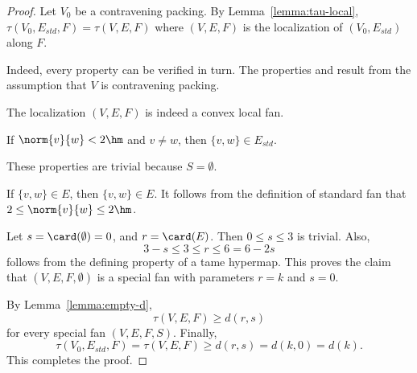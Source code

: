 \begin{proof}
  Let $V_0$ be a contravening packing.  By
  Lemma~\ref{lemma:tau-local}, $\tau(V_0,E_{std},F)=\tau(V,E,F)$ where
  $(V,E,F)$ is the localization of $(V_0,E_{std})$ along $F$.

    Indeed,
  every property can be verified in turn.  The properties
   and  result from the assumption that
  $V$ is contravening packing.

  The localization $(V,E,F)$ is indeed a convex local fan.

 If $\norm{v}{w}<2\hm$ and $v\ne w$, then $\{v,w\}\in
E_{std}$.

  These properties are trivial because
$S=\emptyset$.

 If $\{v,w\}\in E$, then $\{v,w\}\in E$.  It follows from
the definition of standard fan that $2\le \norm{v}{w}\le 2\hm$.

 Let $s=\card(\emptyset) = 0$, and $r=\card(E)$.  Then
$0\le s\le 3$ is trivial. Also,
\[ 3-s \le 3\le r \le 6=6 - 2s\] 
follows from the defining property  of a tame
hypermap.  This proves the claim that $(V,E,F,\emptyset)$ is a special fan with parameters $r=k$ and $s=0$.

By Lemma~\ref{lemma:empty-d}, 
\[ 
\tau(V,E,F) \ge d (r,s)
\] 
for every special fan $(V,E,F,S)$. 
Finally, 
\[ 
\tau(V_0,E_{std},F)=\tau(V,E,F) \ge d(r,s) = d(k,0) = d(k).
\]   
This completes the proof.
\end{proof}



